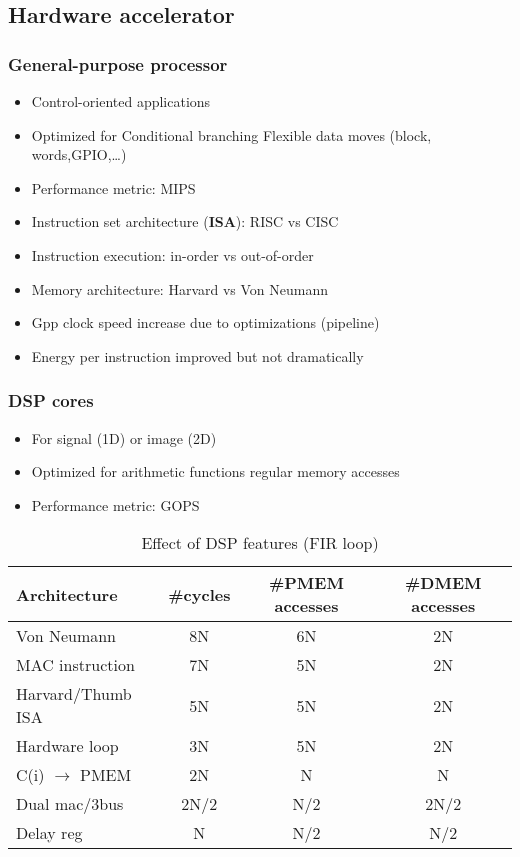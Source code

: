 \subsection{Hardware accelerator}
\subsubsection{General-purpose processor}
\begin{itemize}
  \item Control-oriented applications
  \item Optimized for
    \subitem Conditional branching
    \subitem Flexible data moves (block, words,GPIO,\dots)
  \item Performance metric: MIPS
  \item Instruction set architecture (\textbf{ISA}): RISC vs CISC
  \item Instruction execution: in-order vs out-of-order
  \item Memory architecture: Harvard vs Von Neumann
  \item Gpp clock speed increase due to optimizations (pipeline)
  \item Energy per instruction improved but not dramatically
\end{itemize}


\subsubsection{DSP cores}
\begin{itemize}
  \item For signal (1D) or image (2D)
  \item Optimized for
    \subitem arithmetic functions
    \subitem regular memory accesses
  \item Performance metric: GOPS
\end{itemize}



\begin{table}[!ht]
  \centering
  \begin{tabular}{|l|c|c|c|}
    \hline
    Architecture&\#cycles& \#PMEM accesses& \#DMEM accesses\\
    \hline \hline
    Von Neumann & 8N& 6N& 2N\\
    \hline
    MAC instruction& 7N&5N&2N\\
    \hline
    Harvard/Thumb ISA& 5N&5N&2N\\
    \hline
    Hardware loop& 3N&5N&2N\\
    \hline
    C(i) \(\rightarrow\) PMEM& 2N& N& N\\
    \hline
    Dual mac/3bus& 2N/2& N/2& 2N/2\\
    \hline
    Delay reg& N&N/2&N/2\\
    \hline
  \end{tabular}
  \caption{Effect of DSP features (FIR loop)}
  \label{table:dsp}
\end{table}

